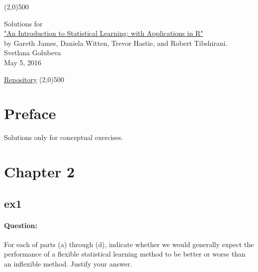 \documentclass[a4paper,12pt,titlepage]{article} %
\begin{document}
\begin{titlepage}

\begin{center}
	\line(2,0){500}
\end{center}

\vspace{60pt}

\begin{center}	
	{\Large{Solutions for}}\\
	\vspace{20pt}
	\href{http://www.springer.com/us/book/9781461471370}{\Huge{"An Introduction to Statistical Learning: with Applications in R"}}\\
	\vspace{20pt}
	{\LARGE{by Gareth James, Daniela Witten, Trevor Hastie, and Robert Tibshirani.}}\\
	\vspace{20pt}
	Svetlana Golubeva\\
	\vspace{20pt}
	May 5, 2016
\end{center}

\vspace{\fill}
\begin{center}
	\href{https://github.com/attillax/ISL}{Repository}
	\line(2,0){500}
\end{center}

\end{titlepage}

\tableofcontents
\newpage
\section{Preface}

Solutions only for conceptual exercises.

\newpage
\section{Chapter 2}
\subsection{ex1}
\paragraph{Question:} For each of parts (a) through (d), indicate whether we would generally expect the performance of a flexible statistical learning method to be better or worse than an inflexible method. Justify your answer.
\end{document}

